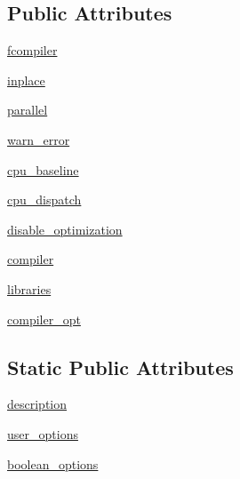 \subsection*{Public Attributes}
\begin{DoxyCompactItemize}
\item 
\hyperlink{classnumpy_1_1distutils_1_1command_1_1build__clib_1_1build__clib_a5c68043f21e2af88f465f5d4263de368}{fcompiler}
\item 
\hyperlink{classnumpy_1_1distutils_1_1command_1_1build__clib_1_1build__clib_ab5c32ebfd465a19adb3f34fb11dedc80}{inplace}
\item 
\hyperlink{classnumpy_1_1distutils_1_1command_1_1build__clib_1_1build__clib_ae0354ec19374c264111931dc70e05888}{parallel}
\item 
\hyperlink{classnumpy_1_1distutils_1_1command_1_1build__clib_1_1build__clib_a78bc2b42fa9c3e49ee9d923cdbfd8d3b}{warn\+\_\+error}
\item 
\hyperlink{classnumpy_1_1distutils_1_1command_1_1build__clib_1_1build__clib_ad98b1cb5c4f6dcd991b170fbf049925d}{cpu\+\_\+baseline}
\item 
\hyperlink{classnumpy_1_1distutils_1_1command_1_1build__clib_1_1build__clib_af04a276e7d09ae56efd673ff37843a10}{cpu\+\_\+dispatch}
\item 
\hyperlink{classnumpy_1_1distutils_1_1command_1_1build__clib_1_1build__clib_a61aa49884789e8bb17cd98cdeb13df77}{disable\+\_\+optimization}
\item 
\hyperlink{classnumpy_1_1distutils_1_1command_1_1build__clib_1_1build__clib_a210aa33e604875be4640598bf4cc30cd}{compiler}
\item 
\hyperlink{classnumpy_1_1distutils_1_1command_1_1build__clib_1_1build__clib_a6c29974db326349933a664df53ff9630}{libraries}
\item 
\hyperlink{classnumpy_1_1distutils_1_1command_1_1build__clib_1_1build__clib_a0441396e22a45d8c5387fa37ef3d9d5a}{compiler\+\_\+opt}
\end{DoxyCompactItemize}
\subsection*{Static Public Attributes}
\begin{DoxyCompactItemize}
\item 
\hyperlink{classnumpy_1_1distutils_1_1command_1_1build__clib_1_1build__clib_a7061451557cbb46dee9a2855fdb7fe77}{description}
\item 
\hyperlink{classnumpy_1_1distutils_1_1command_1_1build__clib_1_1build__clib_ae1755c055bf3b331db637935ea17b2bc}{user\+\_\+options}
\item 
\hyperlink{classnumpy_1_1distutils_1_1command_1_1build__clib_1_1build__clib_a5240d6e323bf2a4d0a59b6d2e8f7e149}{boolean\+\_\+options}
\end{DoxyCompactItemize}


